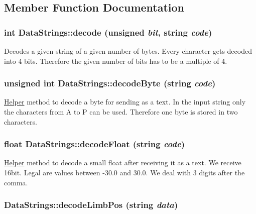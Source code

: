 \subsection{Member Function Documentation}
\hypertarget{classDataStrings_ad9781143a12f82cf677940d35d32d2cc}{
\subsubsection[{decode}]{\setlength{\rightskip}{0pt plus 5cm}int DataStrings::decode (unsigned {\em bit}, \/  string {\em code})}}
\label{classDataStrings_ad9781143a12f82cf677940d35d32d2cc}
Decodes a given string of a given number of bytes. Every character gets decoded into 4 bits. Therefore the given number of bits has to be a multiple of 4. \hypertarget{classDataStrings_ad4368edf61246ac52e03aeb7fb2bbd39}{
\subsubsection[{decodeByte}]{\setlength{\rightskip}{0pt plus 5cm}unsigned int DataStrings::decodeByte (string {\em code})}}
\label{classDataStrings_ad4368edf61246ac52e03aeb7fb2bbd39}
\hyperlink{classHelper}{Helper} method to decode a byte for sending as a text. In the input string only the characters from A to P can be used. Therefore one byte is stored in two characters. \hypertarget{classDataStrings_a4572cc7a60f7c91e4262a7b07b378fa1}{
\subsubsection[{decodeFloat}]{\setlength{\rightskip}{0pt plus 5cm}float DataStrings::decodeFloat (string {\em code})}}
\label{classDataStrings_a4572cc7a60f7c91e4262a7b07b378fa1}
\hyperlink{classHelper}{Helper} method to decode a small float after receiving it as a text. We receive 16bit. Legal are values between -\/30.0 and 30.0. We deal with 3 digits after the comma. \hypertarget{classDataStrings_a46f7f77ab083ffbd1a3835d71e4a0014}{
\subsubsection[{decodeLimbPos}]{ DataStrings::decodeLimbPos (string {\em data})}}
